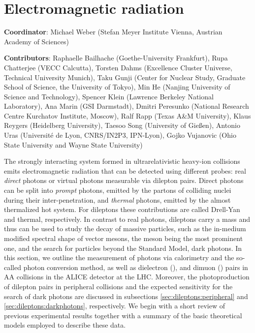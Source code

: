 \documentclass[../report.tex]{subfiles}
\begin{document}
\section{Electromagnetic radiation}
\label{chapter:electromagnetic_radiation}

{ \small
\noindent \textbf{Coordinator}: Michael Weber (Stefan Meyer Institute Vienna, Austrian Academy of Sciences) 

\noindent \textbf{Contributors}: 
		Raphaelle Bailhache (Goethe-University Frankfurt), 
        Rupa Chatterjee (VECC Calcutta),
		Torsten Dahms (Excellence Cluster Universe, Technical University Munich), 
		Taku Gunji (Center for Nuclear Study, Graduate School of Science, the University of Tokyo), 
        Min He (Nanjing University of Science and Technology),
        Spencer Klein (Lawrence Berkeley National Laboratory), 
        Ana Marin (GSI Darmstadt), 
        Dmitri Peresunko (National Research Centre Kurchatov Institute, Moscow),  
        Ralf Rapp (Texas A\&M University), 
        Klaus Reygers (Heidelberg University), 
        Taesoo Song (University of Gie{\ss}en), 
        Antonio Uras (Universit{\'e} de Lyon, CNRS/IN2P3, IPN-Lyon),
        Gojko Vujanovic (Ohio State University and Wayne State University)
}


The strongly interacting system formed in ultrarelativistic heavy-ion collisions 
emits electromagnetic radiation that can be detected using different probes: real {\it direct} photons %
or virtual photons measurable via dilepton pairs. 
Direct photons can be split into {\it prompt} photons, emitted by the partons of colliding nuclei during their inter-penetration, and {\it thermal} photons, emitted by the almost thermalized hot system. 
For dileptons these contributions are called Drell-Yan and thermal, respectively.
In contrast to real photons, dileptons carry a mass and thus can be used to study the decay of massive particles, such as the in-medium modified spectral shape of vector mesons, the \PGr meson being the most prominent one, and the search for particles beyond the Standard Model, \eg dark photons. In this section, we outline the measurement of photons via calorimetry and the so-called photon conversion method, as well as dielectron (\Pepem), and dimuon (\PGmpGmm) pairs in AA collisions in the ALICE detector at the LHC. Moreover, the photoproduction of dilepton pairs in peripheral collisions and the expected sensitivity for the search of dark photons are discussed in subsections \ref{sec:dileptons:peripheral} and \ref{sec:dileptons:darkphotons}, respectively. We begin with a short review of previous experimental results together with a summary of the basic theoretical models employed to describe these data.
\end{document}
